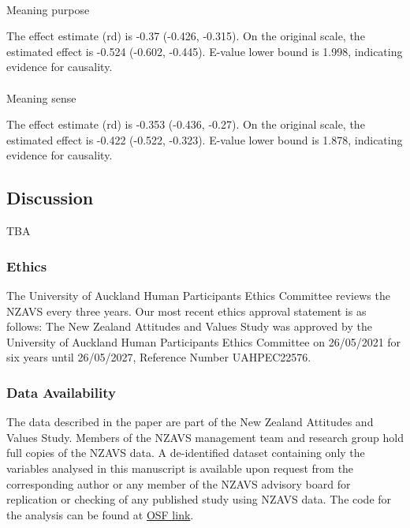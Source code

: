 \documentclass[
  single column]{article}
\makeatletter
\let\oldparagraph\paragraph
\renewcommand{\paragraph}{
    \@ifstar
      \xxxParagraphStar
      \xxxParagraphNoStar
  }
\newcommand{\xxxParagraphStar}[1]{\oldparagraph*{#1}\mbox{}}
\newcommand{\xxxParagraphNoStar}[1]{\oldparagraph{#1}\mbox{}}
\makeatother
\begin{document}
\paragraph{Meaning purpose}\label{meaning-purpose-3}

The effect estimate (rd) is -0.37 (-0.426, -0.315). On the original
scale, the estimated effect is -0.524 (-0.602, -0.445). E-value lower
bound is 1.998, indicating evidence for causality.

\paragraph{Meaning sense}\label{meaning-sense-3}

The effect estimate (rd) is -0.353 (-0.436, -0.27). On the original
scale, the estimated effect is -0.422 (-0.522, -0.323). E-value lower
bound is 1.878, indicating evidence for causality.

\newpage{}

\subsection{Discussion}\label{discussion}

TBA

\subsubsection{Ethics}\label{ethics}

The University of Auckland Human Participants Ethics Committee reviews
the NZAVS every three years. Our most recent ethics approval statement
is as follows: The New Zealand Attitudes and Values Study was approved
by the University of Auckland Human Participants Ethics Committee on
26/05/2021 for six years until 26/05/2027, Reference Number UAHPEC22576.

\subsubsection{Data Availability}\label{data-availability}

The data described in the paper are part of the New Zealand Attitudes
and Values Study. Members of the NZAVS management team and research
group hold full copies of the NZAVS data. A de-identified dataset
containing only the variables analysed in this manuscript is available
upon request from the corresponding author or any member of the NZAVS
advisory board for replication or checking of any published study using
NZAVS data. The code for the analysis can be found at
\href{https://osf.io/ab7cx/}{OSF link}.
\end{document}
